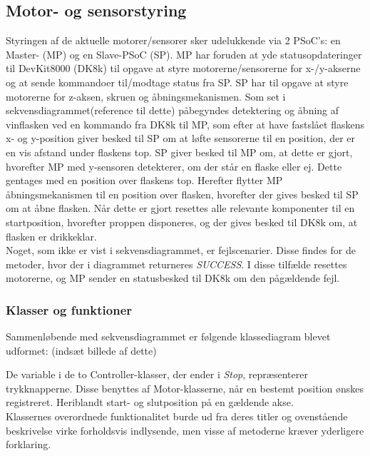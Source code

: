 \subsection{Motor- og sensorstyring}

Styringen af de aktuelle motorer/sensorer sker udelukkende via 2 PSoC's: en Master- (MP) og en Slave-PSoC (SP). MP har foruden at yde statusopdateringer til DevKit8000 (DK8k) til opgave at styre motorerne/sensorerne for x-/y-akserne og at sende kommandoer til/modtage status fra SP. SP har til opgave at styre motorerne for z-aksen, skruen og åbningsmekanismen. Som set i sekvensdiagrammet(reference til dette) påbegyndes detektering og åbning af vinflasken ved en kommando fra DK8k til MP, som efter at have fastslået flaskens x- og y-position giver besked til SP om at løfte sensorerne til en position, der er en vis afstand under flaskens top. SP giver besked til MP om, at dette er gjort, hvorefter MP med y-sensoren detekterer, om der står en flaske eller ej. Dette gentages med en position over flaskens top. Herefter flytter MP åbningsmekanismen til en position over flasken, hvorefter der gives besked til SP om at åbne flasken. Når dette er gjort resettes alle relevante komponenter til en startposition, hvorefter proppen disponeres, og der gives besked til DK8k om, at flasken er drikkeklar. \\
Noget, som ikke er vist i sekvensdiagrammet, er fejlscenarier. Disse findes for de metoder, hvor der i diagrammet returneres \textit{SUCCESS}. I disse tilfælde resettes motorerne, og MP sender en statusbesked til DK8k om den pågældende fejl. \\

\subsubsection{Klasser og funktioner}

Sammenløbende med sekvensdiagrammet er følgende klassediagram blevet udformet: (indsæt billede af dette)

De variable i de to Controller-klasser, der ender i \textit{Stop}, repræsenterer trykknapperne. Disse benyttes af Motor-klasserne, når en bestemt position ønskes registreret. Heriblandt start- og slutposition på en gældende akse. \\
Klassernes overordnede funktionalitet burde ud fra deres titler og ovenstående beskrivelse virke forholdsvis indlysende, men visse af metoderne kræver yderligere forklaring.


